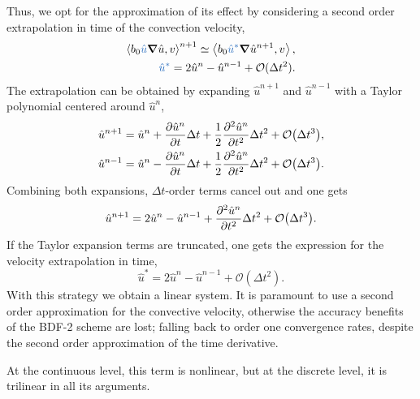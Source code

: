 \documentclass[../../thesis.tex]{subfiles}
\newcommand{\inner}[2]{\left<#1, #2\right>}
\newcommand{\dt}{\ensuremath{\Delta t}}
\begin{document}
Thus, we opt for the approximation of its effect by considering a second order extrapolation in time 
of the convection velocity,
\begin{subequations}
    \begin{align}
        \inner{b_0 \textcolor{NavyBlue}{\hat{u}} \grad \hat{u}}{v}^{n+1} 
        \simeq 
        \inner{b_0 \textcolor{NavyBlue}{\hat{u}^{*}} \grad \hat{u}^{n+1}}{v}, \\
        \textcolor{NavyBlue}{\hat{u}^{*}} = 2 \hat{u}^{n} - \hat{u}^{n-1} + \mathcal{O}(\dt^2).
        \label{eq:semi_implicit_approximation_convective_term}
    \end{align}
\end{subequations}
The extrapolation can be obtained by expanding $\hat{u}^{n+1}$ and $\hat{u}^{n-1}$
with a Taylor polynomial centered around $\hat{u}^{n}$,
\begin{subequations}
    \begin{align}
        \hat{u}^{n+1} &= \hat{u}^{n} 
        + \pdv{\hat{u}^{n}}{t} \dt 
        + \frac{1}{2}\pdv[2]{\hat{u}^{n}}{t} \dt^2 
        + \mathcal{O}\qty(\dt^3),
        \\
        \hat{u}^{n-1} &= \hat{u}^{n} 
        - \pdv{\hat{u}^{n}}{t} \dt 
        + \frac{1}{2}\pdv[2]{\hat{u}^{n}}{t} \dt^2 
        + \mathcal{O}\qty(\dt^3).
    \end{align}
\end{subequations}
Combining both expansions, \dt-order terms cancel out and one gets
\begin{equation}
    \hat{u}^{n+1} = 
    2 \hat{u}^{n} 
    -\hat{u}^{n-1} 
    + \pdv[2]{\hat{u}^{n}}{t} \dt^2 
    + \mathcal{O}\qty(\dt^3).
\end{equation}
If the Taylor expansion terms are truncated, 
one gets the expression for the velocity extrapolation in time,
\begin{equation}
    \hat{u}^{*} = 
    2 \hat{u}^{n} 
    -\hat{u}^{n-1}
    + \mathcal{O}(\dt^2).
    \label{eq:u_star_approximation}
\end{equation}
With this strategy we obtain a linear system.
It is paramount to use a second order approximation for the convective velocity,
otherwise the accuracy benefits of the BDF-2 scheme are lost;
falling back to order one convergence rates, 
despite the second order approximation of the time derivative.

At the continuous level, this term is nonlinear,
but at the discrete level, it is trilinear in all its arguments.
\end{document}
